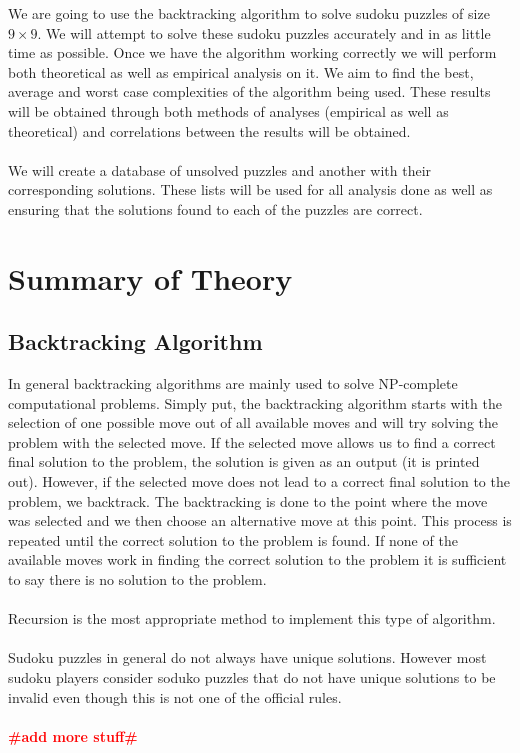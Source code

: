 \documentclass[12pt,a4paper,titlepage]{article}
\newcommand{\todo}[1]{\textcolor{red}{\textbf{\##1\#}}}
\begin{document}
We are going to use the backtracking algorithm to solve sudoku puzzles of size $9\times 9$. We will attempt to solve these sudoku puzzles accurately and in as little time as possible. Once we have the algorithm working correctly we will perform both theoretical as well as empirical analysis on it. We aim to find the best, average and worst case complexities of the algorithm being used. These results will be obtained through both methods of analyses (empirical as well as theoretical) and correlations between the results will be obtained.
\\
\\
We will create a database of unsolved puzzles and another with their corresponding solutions. These lists will be used for all analysis done as well as ensuring that the solutions found to each of the puzzles are correct. 
\\

\section{Summary of Theory}

\subsection{Backtracking Algorithm}

In general backtracking algorithms are mainly used to solve NP-complete computational problems. Simply put, the backtracking algorithm starts with the selection of one possible move out of all available moves and will try solving the problem with the selected move. If the selected move allows us to find a correct final solution to the problem, the solution is given as an output (it is printed out). However, if the selected move does not lead to a correct final solution to the problem, we backtrack. The backtracking is done to the point where the move was selected and we then choose an alternative move at this point. This process is repeated until the correct solution to the problem is found. If none of the available moves work in finding the correct solution to the problem it is sufficient to say there is no solution to the problem.
\\
\\
Recursion is the most appropriate method to implement this type of algorithm.
\\
\\
Sudoku puzzles in general do not always have unique solutions. However most sudoku players consider soduko puzzles that do not have unique solutions to be invalid even though this is not one of the official rules. 
\\
\\
\todo{add more stuff}
\end{document}
